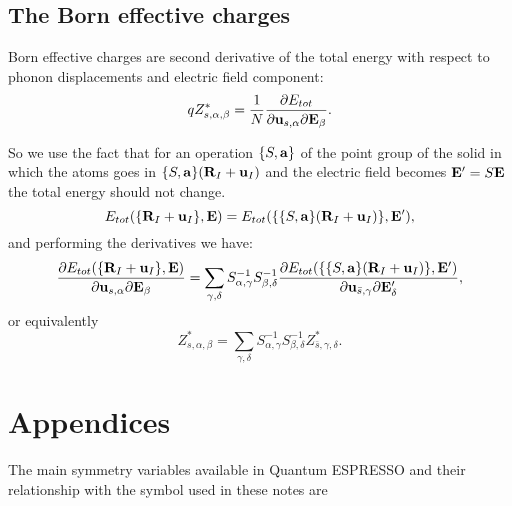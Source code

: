\documentclass[12pt,a4paper,twoside]{report}
\begin{document}
\section{The Born effective charges}
Born effective charges are second derivative of the total energy with respect to phonon displacements and electric field component:
\begin{equation}
qZ^*_{s,\alpha,\beta}= {1\over N} {\partial E_{tot} \over \partial {\bf u}_{s,\alpha} \partial {\bf E}_\beta}.
\end{equation}

So we use the fact that for an operation $\{S,{\bf a}\}$ of the point group of the solid in which the atoms goes in $\{S,{\bf a}\} ({\bf R}_I+{\bf u}_I)$ and the electric field becomes 
${\bf E}'=S{\bf E}$ the total energy should not change.
\begin{equation}
E_{tot}(\{{\bf R}_I+{\bf u}_I\},{\bf E}) =
E_{tot}(\{\{S,{\bf a}\}({\bf R}_I+{\bf u}_I)\},{\bf E}'),
\end{equation}
and performing the derivatives we have:
\begin{equation}
{\partial E_{tot}(\{{\bf R}_I+{\bf u}_I\},{\bf E}) \over  \partial {\bf u}_{s,\alpha} \partial {\bf E}_\beta} = \sum_{\gamma,\delta} S^{-1}_{\alpha,\gamma} S^{-1}_{\beta,\delta} {\partial 
E_{tot}(\{\{S,{\bf a}\}({\bf R}_I+{\bf u}_I)\},{\bf E}')
\over \partial {\bf u}_{\bar s,\gamma} \partial {\bf E}'_\delta},
\end{equation}
or equivalently
\begin{equation}
Z^*_{s,\alpha,\beta}
= \sum_{\gamma,\delta} S^{-1}_{\alpha,\gamma} S^{-1}_{\beta,\delta} 
Z^*_{\bar s,\gamma,\delta}.
\end{equation}

\newpage
{\color{dark-blue}\chapter{Appendices}}
\color{black}
The main symmetry variables available in Quantum ESPRESSO and their relationship with the symbol used in these notes are
\end{document}
